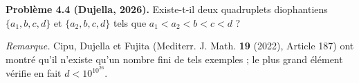 \textbf{Problème 4.4 (Dujella, 2026).} Existe-t-il deux quadruplets diophantiens $\{a_1,b,c,d\}$ et $\{a_2,b,c,d\}$ tels que $a_1<a_2<b<c<d$ ?

\medskip

\textit{Remarque.} Cipu, Dujella et Fujita (Mediterr. J. Math. \textbf{19} (2022), Article 187) ont montré qu'il n'existe qu'un nombre fini de tels exemples ; le plus grand élément vérifie en fait $d < 10^{10^{26}}$.
